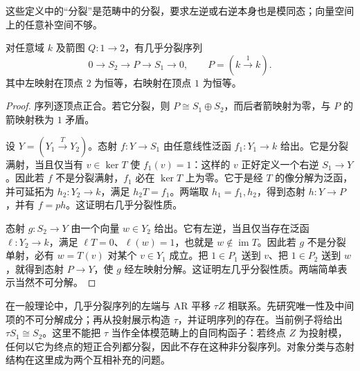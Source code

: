 这些定义中的“分裂”是范畴中的分裂，要求左逆或右逆本身也是模同态；向量空间上的任意补空间不够。

\begin{example}\label{b5:exm:a2-almost-split}
	对任意域 \(k\) 及箭图 \(Q:1\to2\)，有几乎分裂序列
	\[
		0\longrightarrow S_2\longrightarrow P\longrightarrow S_1\longrightarrow0,\qquad P=(k\xrightarrow{1}k).
	\]
	其中左映射在顶点 \(2\) 为恒等，右映射在顶点 \(1\) 为恒等。
\end{example}
\begin{proof}
	序列逐顶点正合。若它分裂，则 \(P\cong S_1\oplus S_2\)，而后者箭映射为零，与 \(P\) 的箭映射秩为 \(1\) 矛盾。

	设 \(Y=(Y_1\xrightarrow{T}Y_2)\)。态射 \(f:Y\to S_1\) 由任意线性泛函 \(f_1:Y_1\to k\) 给出。它是分裂满射，当且仅当有 \(v\in\ker T\) 使 \(f_1(v)=1\)：这样的 \(v\) 正好定义一个右逆 \(S_1\to Y\)。因此若 \(f\) 不是分裂满射，\(f_1\) 必在 \(\ker T\) 上为零。它于是经 \(T\) 的像分解为泛函，并可延拓为 \(h_2:Y_2\to k\)，满足 \(h_2T=f_1\)。两端取 \(h_1=f_1,h_2\)，得到态射 \(h:Y\to P\)，并有 \(f=ph\)。这证明右几乎分裂性质。

	态射 \(g:S_2\to Y\) 由一个向量 \(w\in Y_2\) 给出。它有左逆，当且仅当存在泛函 \(\ell:Y_2\to k\)，满足 \(\ell T=0\)、\(\ell(w)=1\)，也就是 \(w\notin\operatorname{im}T\)。因此若 \(g\) 不是分裂单射，必有 \(w=T(v)\) 对某个 \(v\in Y_1\) 成立。把 \(1\in P_1\) 送到 \(v\)、把 \(1\in P_2\) 送到 \(w\)，就得到态射 \(P\to Y\)，使 \(g\) 经左映射分解。这证明左几乎分裂性质。两端简单表示当然不可分解。
\end{proof}

在一般理论中，几乎分裂序列的左端与 AR 平移 \(\tau Z\) 相联系。先研究唯一性及中间项的不可分解成分；再从投射展示构造 \(\tau\)，并证明序列的存在。当前例子将给出 \(\tau S_1\cong S_2\)。这里不能把 \(\tau\) 当作全体模范畴上的自同构函子：若终点 \(Z\) 为投射模，任何以它为终点的短正合列都分裂，因此不存在这种非分裂序列。对象分类与态射结构在这里成为两个互相补充的问题。
